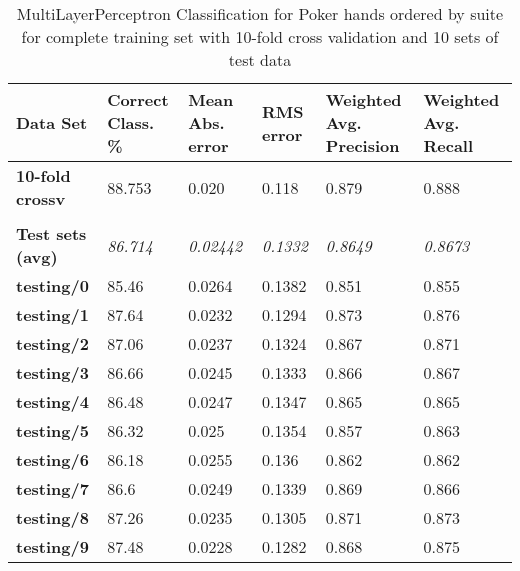 \documentclass[10pt, a4paper]{article}
\begin{document}
\begin{table}[htbp]
  \centering
  \begin{tabular}{p{3cm}p{1.5cm}p{1.5cm}p{1.5cm}p{1.5cm}p{1.5cm}}
    \toprule
    \textbf{Data Set} & Correct Class. \% & Mean Abs. error & RMS error & Weighted Avg. Precision & Weighted Avg. Recall \\
    \midrule
    \textbf{10-fold crossv} & 88.753 & 0.020 & 0.118 & 0.879 & 0.888 \\
    \textbf{} &       &       &       &       &  \\
    \textbf{Test sets (avg)} & \textit{86.714} & \textit{0.02442} & \textit{0.1332} & \textit{0.8649} & \textit{0.8673} \\
    \textbf{   testing/0} & 85.46 & 0.0264 & 0.1382 & 0.851 & 0.855 \\
    \textbf{   testing/1} & 87.64 & 0.0232 & 0.1294 & 0.873 & 0.876 \\
    \textbf{   testing/2} & 87.06 & 0.0237 & 0.1324 & 0.867 & 0.871 \\
    \textbf{   testing/3} & 86.66 & 0.0245 & 0.1333 & 0.866 & 0.867 \\
    \textbf{   testing/4} & 86.48 & 0.0247 & 0.1347 & 0.865 & 0.865 \\
    \textbf{   testing/5} & 86.32 & 0.025 & 0.1354 & 0.857 & 0.863 \\
    \textbf{   testing/6} & 86.18 & 0.0255 & 0.136 & 0.862 & 0.862 \\
    \textbf{   testing/7} & 86.6  & 0.0249 & 0.1339 & 0.869 & 0.866 \\
    \textbf{   testing/8} & 87.26 & 0.0235 & 0.1305 & 0.871 & 0.873 \\
    \textbf{   testing/9} & 87.48 & 0.0228 & 0.1282 & 0.868 & 0.875 \\
    \bottomrule
    \end{tabular}%

	\caption{MultiLayerPerceptron Classification for Poker hands ordered by suite for complete training set with 10-fold cross validation and 10 sets of test data}   
  \label{tab:nnosresults}%
\end{table}%
\end{document}
